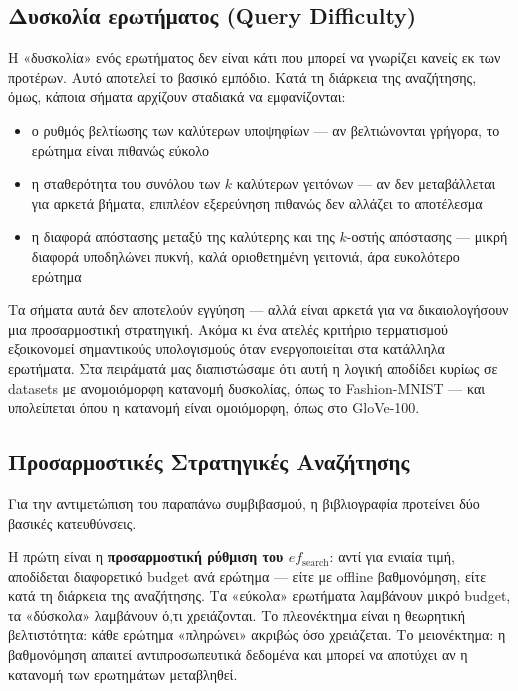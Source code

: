 \documentclass[12pt,a4paper]{article}
\begin{document}
\subsection{Δυσκολία ερωτήματος (Query Difficulty)}
Η «δυσκολία» ενός ερωτήματος δεν είναι κάτι που μπορεί να γνωρίζει κανείς εκ των προτέρων. Αυτό αποτελεί το βασικό εμπόδιο. Κατά τη διάρκεια της αναζήτησης, όμως, κάποια σήματα αρχίζουν σταδιακά να εμφανίζονται:
\begin{itemize}
    \item ο ρυθμός βελτίωσης των καλύτερων υποψηφίων --- αν βελτιώνονται γρήγορα, το ερώτημα είναι πιθανώς εύκολο
    \item η σταθερότητα του συνόλου των $k$ καλύτερων γειτόνων --- αν δεν μεταβάλλεται για αρκετά βήματα, επιπλέον εξερεύνηση πιθανώς δεν αλλάζει το αποτέλεσμα
    \item η διαφορά απόστασης μεταξύ της καλύτερης και της $k$-οστής απόστασης --- μικρή διαφορά υποδηλώνει πυκνή, καλά οριοθετημένη γειτονιά, άρα ευκολότερο ερώτημα
\end{itemize}
Τα σήματα αυτά δεν αποτελούν εγγύηση --- αλλά είναι αρκετά για να δικαιολογήσουν μια προσαρμοστική στρατηγική. Ακόμα κι ένα ατελές κριτήριο τερματισμού εξοικονομεί σημαντικούς υπολογισμούς όταν ενεργοποιείται στα κατάλληλα ερωτήματα. Στα πειράματά μας διαπιστώσαμε ότι αυτή η λογική αποδίδει κυρίως σε datasets με ανομοιόμορφη κατανομή δυσκολίας, όπως το Fashion-MNIST --- και υπολείπεται όπου η κατανομή είναι ομοιόμορφη, όπως στο GloVe-100.

\subsection{Προσαρμοστικές Στρατηγικές Αναζήτησης}

Για την αντιμετώπιση του παραπάνω συμβιβασμού, η βιβλιογραφία προτείνει δύο βασικές κατευθύνσεις.

Η πρώτη είναι η \textbf{προσαρμοστική ρύθμιση του $ef_{\text{search}}$}: αντί για ενιαία τιμή, αποδίδεται διαφορετικό budget ανά ερώτημα --- είτε με offline βαθμονόμηση, είτε κατά τη διάρκεια της αναζήτησης. Τα «εύκολα» ερωτήματα λαμβάνουν μικρό budget, τα «δύσκολα» λαμβάνουν ό,τι χρειάζονται. Το πλεονέκτημα είναι η θεωρητική βελτιστότητα: κάθε ερώτημα «πληρώνει» ακριβώς όσο χρειάζεται. Το μειονέκτημα: η βαθμονόμηση απαιτεί αντιπροσωπευτικά δεδομένα και μπορεί να αποτύχει αν η κατανομή των ερωτημάτων μεταβληθεί.
\end{document}
